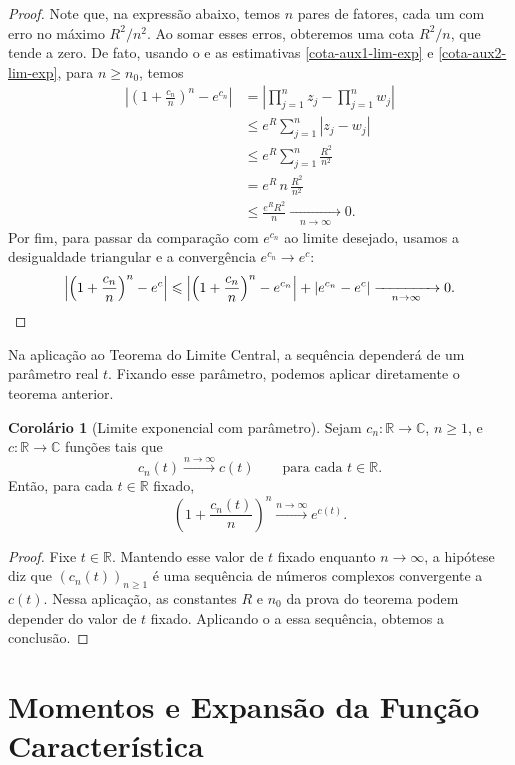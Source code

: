 \documentclass[12pt,portuguese]{article}
\theoremstyle{definition}
\newtheorem{corollary}[corollary]{Corolário}
\theoremstyle{plainexercise}
\theoremstyle{starredexercise}
\theoremstyle{definition}
\begin{document}
\begin{proof}
Note que, na expressão abaixo, temos $n$ pares de fatores, cada um com erro no máximo $R^2/n^2$.
Ao somar esses erros, obteremos uma cota $R^2/n$, que tende a zero.
De fato, usando o  e as estimativas \eqref{cota-aux1-lim-exp}
e \eqref{cota-aux2-lim-exp}, para $n\geqslant n_0$, temos
\begin{align*}
\left|\left(1+\frac{c_n}{n}\right)^{n}-e^{c_n}\right|
&= \left|\prod_{j=1}^{n}z_j-\prod_{j=1}^{n}w_j\right|
\\[0.3cm]
&\leqslant e^{R}\sum_{j=1}^{n}|z_j-w_j|
\\[0.3cm]
&\leqslant e^R\sum_{j=1}^{n}\frac{R^{2}}{n^{2}}
\\[0.3cm]
&= e^R\,n\,\frac{R^{2}}{n^{2}}
\\[0.3cm]
&\leqslant \frac{e^R R^{2}}{n}
\xrightarrow[\quad n\to\infty\quad ]{} 0.
\end{align*}
Por fim, para passar da comparação com $e^{c_n}$ ao limite desejado,
usamos a desigualdade triangular e a convergência $e^{c_n}\to e^c$:
\[
\left|\left(1+\frac{c_n}{n}\right)^n-e^c\right|
\leqslant
\left|\left(1+\frac{c_n}{n}\right)^n-e^{c_n}\right|
+|e^{c_n}-e^c|
\xrightarrow[\quad n\to\infty\quad ]{} 0. \qedhere
\]
\end{proof}

Na aplicação ao Teorema do Limite Central, a sequência dependerá de um
parâmetro real $t$. Fixando esse parâmetro, podemos aplicar diretamente
o teorema anterior.

\begin{corollary}[Limite exponencial com parâmetro]\label{cor:limite-exp-parametro}
Sejam $c_n\colon\mathbb{R}\to\mathbb{C}$, $n\geqslant1$, e
$c\colon\mathbb{R}\to\mathbb{C}$ funções tais que
\[
c_n(t)\xrightarrow{n\to\infty}c(t)
\qquad\text{para cada }t\in\mathbb{R}.
\]
Então, para cada $t\in\mathbb{R}$ fixado,
\[
\left(1+\frac{c_n(t)}{n}\right)^n
\xrightarrow{n\to\infty}e^{c(t)}.
\]
\end{corollary}

\begin{proof}
Fixe $t\in\mathbb{R}$. Mantendo esse valor de $t$ fixado enquanto
$n\to\infty$, a hipótese diz que $(c_n(t))_{n\geqslant1}$ é uma
sequência de números complexos convergente a $c(t)$. Nessa aplicação,
as constantes $R$ e $n_0$ da prova do teorema podem depender do valor de $t$
fixado. Aplicando o  a essa sequência,
obtemos a conclusão.
\end{proof}

\section{Momentos e Expansão da Função Característica}\label{sec:momentos}
\end{document}
